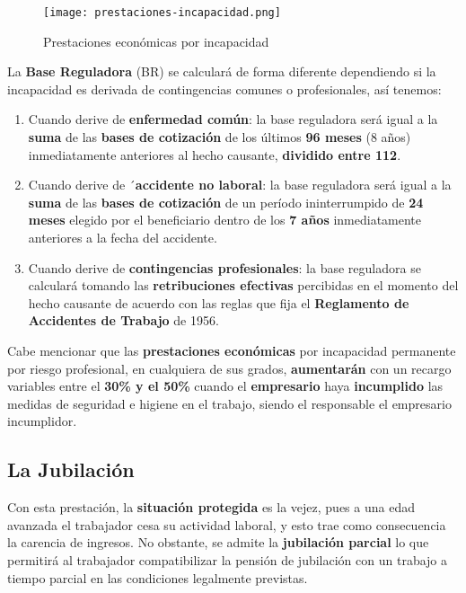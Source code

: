 \begin{itemize}
    \begin{figure}[H]
        \centering
        \texttt{[image: prestaciones-incapacidad.png]}
        \caption{Prestaciones económicas por incapacidad}
    \end{figure}

    La \textbf{Base Reguladora} (BR) se calculará de forma diferente dependiendo si la incapacidad es derivada de contingencias comunes o profesionales, así tenemos:

    \begin{enumerate}
        \item Cuando derive de \textbf{enfermedad común}: la base reguladora será igual a la \textbf{suma} de las 	\textbf{bases de cotización} de los últimos \textbf{96 meses} (8 años) inmediatamente anteriores al hecho causante, \textbf{dividido entre 112}.

        \item Cuando derive de ´\textbf{accidente no laboral}: la base reguladora será igual a la \textbf{suma} de las \textbf{bases de cotización} de un período ininterrumpido de \textbf{24 meses} elegido por el beneficiario  dentro de los \textbf{7 años} inmediatamente anteriores a la fecha del accidente.

        \item Cuando derive de \textbf{contingencias profesionales}: la base reguladora se calculará tomando las \textbf{retribuciones efectivas} percibidas en el momento del hecho causante de acuerdo con las reglas que fija el \textbf{Reglamento de Accidentes de Trabajo} de 1956.
    \end{enumerate}
\end{itemize}

Cabe mencionar que las \textbf{prestaciones económicas} por incapacidad permanente por riesgo profesional, en cualquiera de sus grados, \textbf{aumentarán} con un recargo variables entre el \textbf{30\% y el 50\%} cuando el \textbf{empresario} haya \textbf{incumplido} las medidas de seguridad e higiene en el trabajo, siendo el responsable el empresario incumplidor.

\subsection{La Jubilación}
Con esta prestación, la \textbf{situación protegida} es la vejez, pues a una edad avanzada el trabajador cesa su actividad laboral, y esto trae como consecuencia la carencia de ingresos. No obstante, se admite la \textbf{jubilación parcial} lo que permitirá al trabajador compatibilizar la pensión de jubilación con un trabajo a tiempo parcial en las condiciones legalmente previstas.

